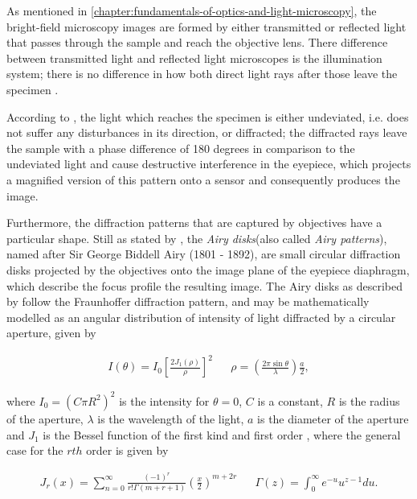 As mentioned in \autoref{chapter:fundamentals-of-optics-and-light-microscopy}, the bright-field microscopy images are formed by either transmitted or reflected light that passes through the sample and reach the objective lens. There difference between transmitted light and reflected light microscopes is the illumination system; there is no difference in how both direct light rays after those leave the specimen \cite{leng2009materials}.

According to , the light which reaches the specimen is either undeviated, i.e. does not suffer any disturbances in its direction, or diffracted; the diffracted rays leave the sample with a phase difference of 180 degrees in comparison to the undeviated light and cause destructive interference in the eyepiece, which projects a magnified version of this pattern onto a sensor and consequently produces the image.

Furthermore, the diffraction patterns that are captured by objectives have a particular shape. Still as stated by , the \emph{Airy disks}(also called \emph{Airy patterns}), named after Sir George Biddell Airy (1801 - 1892), are small circular diffraction disks projected by the objectives onto the image plane of the eyepiece diaphragm, which describe the focus profile the resulting image. The Airy disks as described by  follow the Fraunhoffer diffraction pattern, and may be mathematically modelled as an angular distribution of intensity of light diffracted by a circular aperture, given by

\begin{align}
\label{eqn:airy_function}
I(\theta) = I_{0} 
            \left[ 
            \frac{2 J_{1} (\rho)}{\rho}
            \right]^{2}
&&
\rho = \left( 
        \frac{2 \pi \sin{\theta}}{\lambda}
        \right) \frac{a}{2},
\end{align}

\noindent where $I_{0} = (C \pi R^{2})^{2}$ is the intensity for $\theta = 0$, $C$ is a constant, $R$ is the radius of the aperture, $\lambda$ is the wavelength of the light, $a$ is the diameter of the aperture and $J_{1}$ is the Bessel function of the first kind and first order \cite{mathews1970mathematical}, where the general case for the $rth$ order is given by

\begin{align}
\label{eqn:1st_bessel}
J_{r}(x) = \sum_{n = 0}^{\infty}
            \frac{(-1)^{r}}
                 {r! \Gamma(m + r + 1)}
            \left(
                \frac{x}{2}
            \right)^{m + 2r}
&&
\Gamma(z) = \int_{0}^{\infty} e^{-u} u^{z-1}du.
\end{align}

